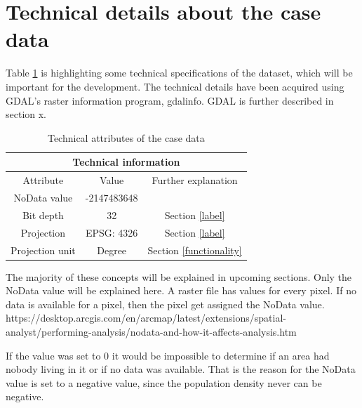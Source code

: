 \section{Technical details about the case data}

Table \ref{tabTech} is highlighting some technical specifications of the dataset, which will be important for the development. The technical details have been acquired using GDAL's raster information program, gdalinfo. GDAL is further described in section x.

\begin{table}[h]%
	\centering
\begin{tabular}{|c|c|c|}
	\hline 
	\multicolumn{3}{|c|}{Technical information} \\ 
	\hline 
	Attribute & Value & Further explanation \\ 
	\hline 
	NoData value & -2147483648 &  \\ 
	\hline 
	Bit depth & 32 &  Section \ref{label}\\ 
	\hline 
	Projection & EPSG: 4326 &  Section \ref{label}\\ 
	\hline 
	Projection unit & Degree & Section \ref{functionality}  \\ 
	\hline 
\end{tabular}
\caption{Technical attributes of the case data}
 \label{tabTech}
\end{table}

The majority of these concepts will be explained in upcoming sections. Only the NoData value will be explained here. A raster file has values for every pixel. If no data is available for a pixel, then the pixel get assigned the NoData value. 
https://desktop.arcgis.com/en/arcmap/latest/extensions/spatial-analyst/performing-analysis/nodata-and-how-it-affects-analysis.htm

If the value was set to 0 it would be impossible to determine if an area had nobody living in it or if no data was available. That is the reason for the NoData value is set to a negative value, since the population density never can be negative.




